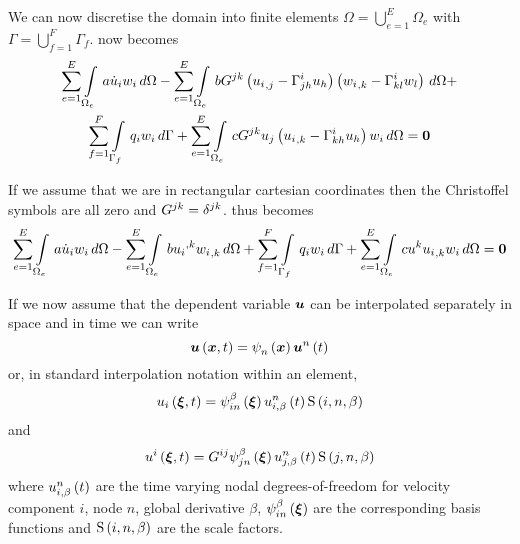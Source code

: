 
We can now discretise the domain into finite elements \ie $\Omega=
\displaystyle{\bigcup_{e=1}^{E}}\Omega_{e}$ with
$\Gamma=\displaystyle{\bigcup_{f=1}^{F}}\Gamma_{f}$. 
now becomes
\begin{multline}
  \dsum_{e=1}^{E}\gint{\Omega_{e}}{}{a\dot{u}_{i}w_{i}}{\Omega}-
  \dsum_{e=1}^{E}\gint{\Omega_{e}}{}{bG^{jk}\pbrac{\partialderiv{u_{i}}{j}-
      \christoffel{i}{j}{h}u_{h}} \pbrac{\partialderiv{w_{i}}{k}-
      \christoffel{i}{k}{l}w_{l}}}{\Omega}+ \\
  \dsum_{f=1}^{F}\gint{\Gamma_{f}}{}{q_{i}w_{i}}{\Gamma} +
  \dsum_{e=1}^{E}\gint{\Omega_{e}}{}{cG^{jk}u_{j}\pbrac{\partialderiv{u_{i}}{k}-
      \christoffel{i}{k}{h}u_{h}}w_{i}}{\Omega}=\vect{0}
  \label{eqn:Burgersfemform1}
\end{multline}

If we assume that we are in rectangular cartesian coordinates then the
Christoffel symbols are all zero and
$G^{jk}=\contrakronecker{j}{k}$.  thus becomes
\begin{equation}
  \dsum_{e=1}^{E}\gint{\Omega_{e}}{}{a\dot{u}_{i}w_{i}}{\Omega}-
  \dsum_{e=1}^{E}\gint{\Omega_{e}}{}{b\contrapartialderiv{u_{i}}{k}
    \partialderiv{w_{i}}{k}}{\Omega}+ 
  \dsum_{f=1}^{F}\gint{\Gamma_{f}}{}{q_{i}w_{i}}{\Gamma} +
  \dsum_{e=1}^{E}\gint{\Omega_{e}}{}{cu^{k}\partialderiv{u_{i}}{k}w_{i}}{\Omega}=\vect{0}
  \label{eqn:Burgersfemform2}
\end{equation}

If we now assume that the dependent variable $\vect{u}$ can be interpolated
separately in space and in time we can write
\begin{equation}
  \fnof{\vect{u}}{\vect{x},t}=\gbfn{n}{}{\vect{x}}\fnof{\nodept{\vect{u}}{n}}{t}
\end{equation}
or, in standard interpolation notation within an element,
\begin{equation}
  \fnof{u_{i}}{\vect{\xi},t}=\idxgbfn{i}{n}{\beta}{\vect{\xi}}
  \fnof{\idxnodedof{u}{i}{n}{\beta}}{t}\idxgsf{i}{n}{\beta}
\end{equation}
and
\begin{equation}
  \fnof{u^{i}}{\vect{\xi},t}=G^{ij}\idxgbfn{j}{n}{\beta}{\vect{\xi}}
  \fnof{\idxnodedof{u}{j}{n}{\beta}}{t}\idxgsf{j}{n}{\beta}
\end{equation}
where $\fnof{\idxnodedof{u}{i}{n}{\beta}}{t}$ are the time varying nodal
degrees-of-freedom for velocity component $i$, node $n$, global derivative $\beta$,
$\idxgbfn{i}{n}{\beta}{\vect{\xi}}$ are the corresponding basis functions 
and $\idxgsf{i}{n}{\beta}$ are the scale factors. 

